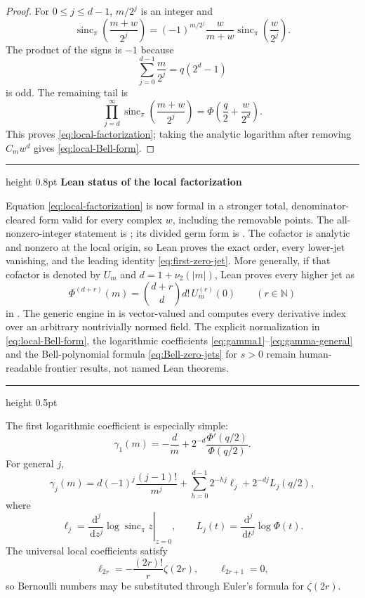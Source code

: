 \documentclass[11pt]{article}
\numberwithin{equation}{section}
\theoremstyle{definition}
\theoremstyle{remark}
\newenvironment{statusbox}[1][]
{\begin{center}\begin{minipage}{0.94\textwidth}%
\color{darkgreen}\hrule height 0.8pt\vspace{0.45em}%
\color{black}\textbf{#1}\par\smallskip}
{\vspace{0.35em}\color{darkgreen}\hrule height 0.5pt\end{minipage}\end{center}}
\newcommand{\N}{\mathbb N}
\newcommand{\sincpi}{\operatorname{sinc}_{\pi}}
\newcommand{\dd}{\,\mathrm d}
\begin{document}
\begin{proof}
For $0\le j\le d-1$, $m/2^j$ is an integer and
\[
 \sincpi\!\left(\frac{m+w}{2^j}\right)
 =(-1)^{m/2^j}\frac{w}{m+w}
 \sincpi\!\left(\frac{w}{2^j}\right).
\]
The product of the signs is $-1$ because
\[
 \sum_{j=0}^{d-1}\frac m{2^j}=q(2^d-1)
\]
is odd.  The remaining tail is
\[
 \prod_{j=d}^{\infty}\sincpi\!\left(\frac{m+w}{2^j}\right)
 =\Phi\!\left(\frac q2+\frac{w}{2^d}\right).
\]
This proves \eqref{eq:local-factorization}; taking the analytic logarithm after removing $C_mw^d$ gives \eqref{eq:local-Bell-form}.
\end{proof}

\begin{statusbox}[Lean status of the local factorization]
Equation \eqref{eq:local-factorization} is now formal in a stronger total,
denominator-cleared form valid for every complex \(w\), including the
removable points.  The all-nonzero-integer statement is
; its divided
germ form is
.
The cofactor is analytic and nonzero at the local origin, so Lean proves the exact order, every
lower-jet vanishing, and the leading identity
\eqref{eq:first-zero-jet}.  More generally, if that cofactor is denoted by
\(U_m\) and \(d=1+\nu_2(|m|)\), Lean proves every higher jet as
\[
 \Phi^{(d+r)}(m)=\binom{d+r}{d}d!\,U_m^{(r)}(0)
 \qquad(r\in\N)
\]
in .
The generic engine in  is vector-valued and computes
every derivative index over an arbitrary nontrivially normed field.  The
explicit normalization in \eqref{eq:local-Bell-form}, the logarithmic coefficients
\eqref{eq:gamma1}--\eqref{eq:gamma-general} and the Bell-polynomial formula
\eqref{eq:Bell-zero-jets} for \(s>0\) remain human-readable frontier
results, not named Lean theorems.
\end{statusbox}

The first logarithmic coefficient is especially simple:
\begin{equation}
 \gamma_1(m)=-\frac d m
 +2^{-d}\frac{\Phi'(q/2)}{\Phi(q/2)}.
 \label{eq:gamma1}
\end{equation}
For general $j$,
\begin{equation}
 \gamma_j(m)
 =d(-1)^j\frac{(j-1)!}{m^j}
 +\sum_{h=0}^{d-1}2^{-hj}\ell_j
 +2^{-dj}L_j(q/2),
 \label{eq:gamma-general}
\end{equation}
where
\[
 \ell_j=\left.\frac{\dd^j}{\dd z^j}\log\sincpi z\right|_{z=0},
 \qquad
 L_j(t)=\frac{\dd^j}{\dd t^j}\log\Phi(t).
\]
The universal local coefficients satisfy
\begin{equation}
 \ell_{2r}=-\frac{(2r)!}{r}\zeta(2r),
 \qquad \ell_{2r+1}=0,
 \label{eq:sinc-log-jet}
\end{equation}
so Bernoulli numbers may be substituted through Euler's formula for $\zeta(2r)$.
\end{document}
